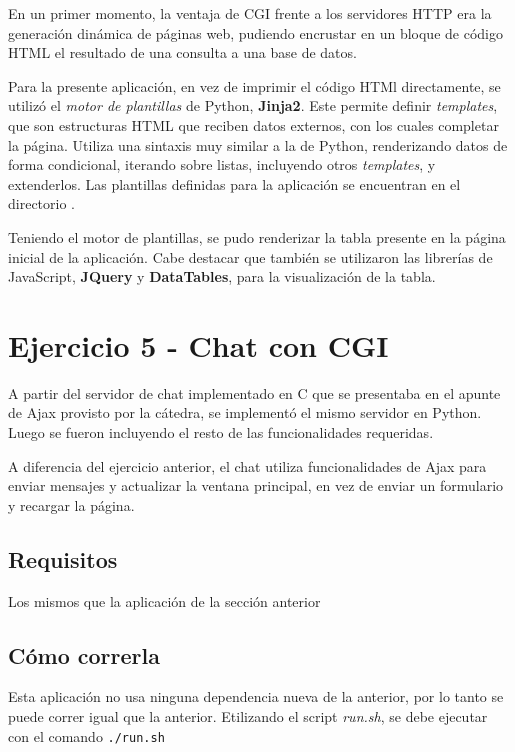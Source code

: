 En un primer momento, la ventaja de CGI frente a los servidores HTTP era la generación dinámica de páginas web, pudiendo encrustar en un bloque de código HTML el resultado de una consulta a una base de datos.

Para la presente aplicación, en vez de imprimir el código HTMl directamente, se utilizó el \emph{motor de plantillas} de Python, \textbf{Jinja2}. Este permite definir \emph{templates}, que son estructuras HTML que reciben datos externos, con los cuales completar la página. Utiliza una sintaxis muy similar a la de Python, renderizando datos de forma condicional, iterando sobre listas, incluyendo otros \emph{templates}, y extenderlos. Las plantillas definidas para la aplicación se encuentran en el directorio .

Teniendo el motor de plantillas, se pudo renderizar la tabla presente en la página inicial de la aplicación. Cabe destacar que también se utilizaron las librerías de JavaScript, \textbf{JQuery} y \textbf{DataTables}, para la visualización de la tabla.  

\section{Ejercicio 5 - Chat con CGI}

A partir del servidor de chat implementado en C que se presentaba en el apunte de Ajax provisto por la cátedra, se implementó el mismo servidor en Python. Luego se fueron incluyendo el resto de las funcionalidades requeridas.

A diferencia del ejercicio anterior, el chat utiliza funcionalidades de Ajax para enviar mensajes y actualizar la ventana principal, en vez de enviar un formulario y recargar la página.

\subsection{Requisitos}

Los mismos que la aplicación de la sección anterior

\subsection{Cómo correrla}

Esta aplicación no usa ninguna dependencia nueva de la anterior, por lo tanto se puede correr igual que la anterior. Etilizando el script \emph{run.sh}, se debe ejecutar con el comando \texttt{./run.sh} 


